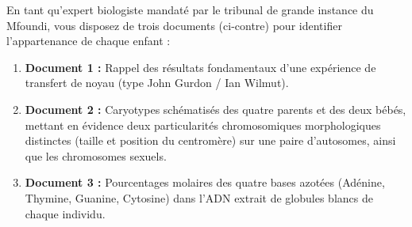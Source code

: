 \documentclass[11pt]{article}
\begin{document}
En tant qu'expert biologiste mandaté par le tribunal de grande instance du Mfoundi, vous disposez de trois documents (ci-contre) pour identifier l'appartenance de chaque enfant :
\begin{enumerate}
    \item \textbf{Document 1 :} Rappel des résultats fondamentaux d'une expérience de transfert de noyau (type John Gurdon / Ian Wilmut).
    \item \textbf{Document 2 :} Caryotypes schématisés des quatre parents et des deux bébés, mettant en évidence deux particularités chromosomiques morphologiques distinctes (taille et position du centromère) sur une paire d'autosomes, ainsi que les chromosomes sexuels.
    \item \textbf{Document 3 :} Pourcentages molaires des quatre bases azotées (Adénine, Thymine, Guanine, Cytosine) dans l'ADN extrait de globules blancs de chaque individu.
\end{enumerate}
\end{document}
